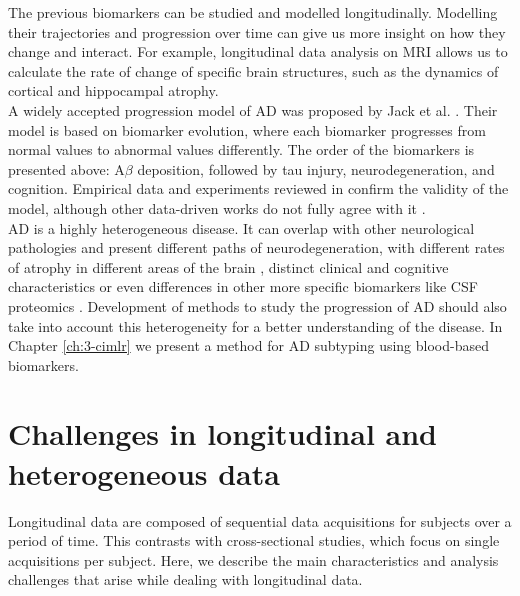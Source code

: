 The previous biomarkers can be studied and modelled longitudinally. Modelling their trajectories and progression over time can give us more insight on how they change and interact. For example, longitudinal data analysis on MRI allows us to calculate the rate of change of specific brain structures, such as the dynamics of cortical and hippocampal atrophy. \\

A widely accepted progression model of AD was proposed by Jack et al. \cite{Jack2010}. Their model is based on biomarker evolution, where each biomarker progresses from normal values to abnormal values differently. The order of the biomarkers is presented above: A$\beta$ deposition, followed by tau injury, neurodegeneration, and cognition. Empirical data and experiments reviewed in \cite{Jack2013} confirm the validity of the model, although other data-driven works do not fully agree with it \cite{Iturria-Medina2016}. \\

AD is a highly heterogeneous disease. It can overlap with other neurological pathologies and present different paths of neurodegeneration, with different rates of atrophy in different areas of the brain \cite{Lam2013,Poulakis2018}, distinct clinical and cognitive characteristics \cite{Murray2011} or even differences in other more specific biomarkers like CSF proteomics \cite{Tijms2020}. Development of methods to study the progression of AD should also take into account this heterogeneity for a better understanding of the disease. In Chapter \ref{ch:3-cimlr} we present a method for AD subtyping using blood-based biomarkers. \\

\section{Challenges in longitudinal and heterogeneous data}

Longitudinal data are composed of sequential data acquisitions for subjects over a period of time. This contrasts with cross-sectional studies, which focus on single acquisitions per subject. Here, we describe the main characteristics and analysis challenges that arise while dealing with longitudinal data. \\

